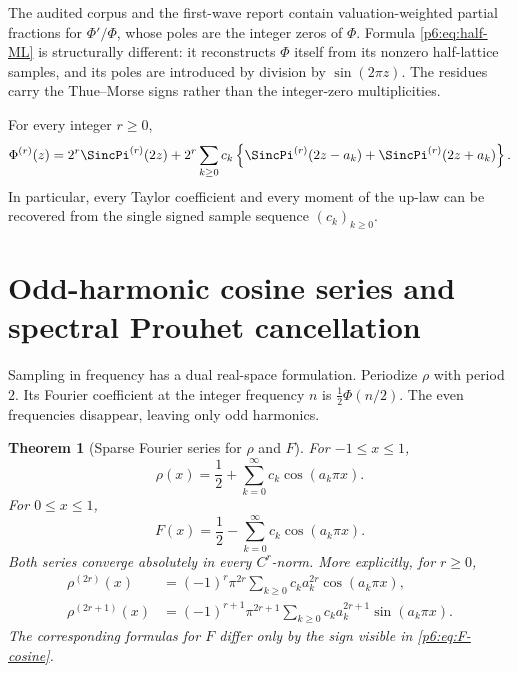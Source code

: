 \documentclass[11pt]{article}
\newtheorem{theorem}{Theorem}[section]
\theoremstyle{definition}
\theoremstyle{remark}
\begin{document}
\begin{remark}
The audited corpus and the first-wave report contain valuation-weighted partial fractions
for \(\Phi'/\Phi\), whose poles are the integer zeros of \(\Phi\).  Formula
\eqref{p6:eq:half-ML} is structurally different: it reconstructs \(\Phi\) itself from its
nonzero half-lattice samples, and its poles are introduced by division by
\(\sin(2\pi z)\).  The residues carry the Thue--Morse signs rather than the
integer-zero multiplicities.
\end{remark}

\begin{corollary}
\label{p6:cor:derivative-cardinal}
For every integer \(r\ge0\),
\begin{equation}
 \Phi^{(r)}(z)
 =2^r\SincPi^{(r)}(2z)
 +2^r\sum_{k\ge0}c_k
 \left\{\SincPi^{(r)}(2z-a_k)+\SincPi^{(r)}(2z+a_k)\right\}.
                                                               \label{p6:eq:derivative-cardinal}
\end{equation}
In particular, every Taylor coefficient and every moment of the up-law can be recovered
from the single signed sample sequence \((c_k)_{k\ge0}\).
\end{corollary}

\section{Odd-harmonic cosine series and spectral Prouhet cancellation}
\label{p6:sec:cosine-p-series}

Sampling in frequency has a dual real-space formulation.  Periodize \(\rho\) with period
\(2\).  Its Fourier coefficient at the integer frequency \(n\) is
\(\frac12\Phi(n/2)\).  The even frequencies disappear, leaving only odd harmonics.

\begin{theorem}[Sparse Fourier series for \(\rho\) and \(F\)]
\label{p6:thm:sparse-cosine}
For \(-1\le x\le1\),
\begin{equation}
\boxed{
 \rho(x)=\frac12+\sum_{k=0}^{\infty}c_k\cos(a_k\pi x).}    \label{p6:eq:rho-odd-cosine}
\end{equation}
For \(0\le x\le1\),
\begin{equation}
\boxed{
 F(x)=\frac12-\sum_{k=0}^{\infty}c_k\cos(a_k\pi x).}      \label{p6:eq:F-cosine}
\end{equation}
Both series converge absolutely in every \(C^r\)-norm.  More explicitly, for
\(r\ge0\),
\begin{align}
 \rho^{(2r)}(x)
 &=(-1)^r\pi^{2r}\sum_{k\ge0}c_ka_k^{2r}\cos(a_k\pi x),  \label{p6:eq:rho-even-der}\\
 \rho^{(2r+1)}(x)
 &=(-1)^{r+1}\pi^{2r+1}\sum_{k\ge0}c_ka_k^{2r+1}
    \sin(a_k\pi x).                                      \label{p6:eq:rho-odd-der}
\end{align}
The corresponding formulas for \(F\) differ only by the sign visible in
\eqref{p6:eq:F-cosine}.
\end{theorem}
\end{document}
